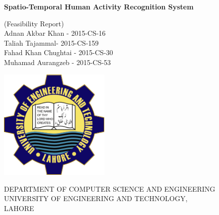 \documentclass[11pt]{article}
\begin{document}
	
	
\begin{titlepage}
	\begin{center}
		\vspace*{1cm}
		
		\Huge
		\textbf{Spatio-Temporal Human Activity Recognition System}
		
		
	
		
		\vspace{1cm}
		
		\textnormal {(Feasibility Report)}\\
		\vspace{1cm}
		\LARGE
		  Adnan Akbar Khan - 2015-CS-16\\
		  	\vspace{0.5cm}
		  Taliah Tajammal- 2015-CS-159\\
		  	\vspace{0.5cm}
		  Fahad Khan Chughtai - 2015-CS-30\\
		  	\vspace{0.5cm}
		  Muhamad Aurangzeb - 2015-CS-53\\
		  
		\vfill
		
		 
		
		\vspace{0.6cm}
		
		\includegraphics[width=0.4\textwidth]{UETlogo.png}
		
		\vspace{0.4cm}
		
\hspace{-.78cm}	\LARGE DEPARTMENT OF COMPUTER SCIENCE AND ENGINEERING\\ 
			\vspace{0.5cm} UNIVERSITY OF ENGINEERING AND TECHNOLOGY,\\ LAHORE\\
			
	
	
		
	\end{center}
\end{titlepage}	
	
\end{document}
